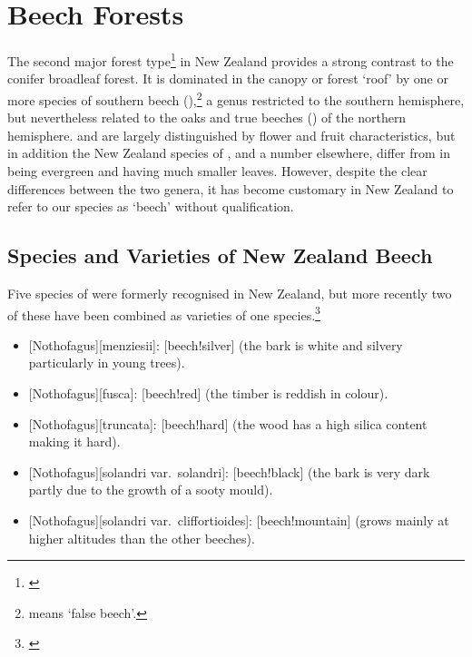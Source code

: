 \chapter{Beech Forests}

The second major forest type\footnote{\cite{wardle1984beeches}} in New Zealand provides a strong contrast to the conifer broadleaf forest.
It is dominated in the canopy or forest `roof' by one or more species of southern beech (),\footnote{ means `false beech'.} a genus restricted to the southern hemisphere, but nevertheless related to the oaks and true beeches () of the northern hemisphere.  and  are largely distinguished by flower and fruit characteristics, but in addition the New Zealand species of , and a number elsewhere, differ from  in being evergreen and having much smaller leaves.
However, despite the clear differences between the two genera, it has become customary in New Zealand to refer to our species as `beech' without qualification.

\section{Species and Varieties of New Zealand Beech}

Five species of  were formerly recognised in New Zealand, but more recently two of these have been combined as varieties of one species.\footnote{\cite{poole1958studies}}

\begin{itemize}
	\item {}[Nothofagus][menziesii]: [beech!silver] (the bark is white and silvery particularly in young trees).
	\item {}[Nothofagus][fusca]: [beech!red] (the timber is reddish in colour).
	\item {}[Nothofagus][truncata]: [beech!hard] (the wood has a high silica content making it hard).
	\item {}[Nothofagus][solandri var.\ solandri]: [beech!black] (the bark is very dark partly due to the growth of a sooty mould).
	\item {}[Nothofagus][solandri var.\ cliffortioides]: [beech!mountain] (grows mainly at higher altitudes than the other beeches).
\end{itemize}

